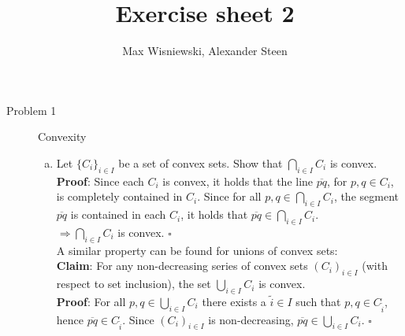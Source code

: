 \documentclass[11pt,a4paper,ngerman]{article}
\date{}
\title{Exercise sheet 2}
\author{Max Wisniewski, Alexander Steen}
\begin{document}

\renewcommand{\figurename}{Figure}

\maketitle
\thispagestyle{fancy}

\begin{description}
\item[Problem 1] Convexity
  \begin{enumerate}[a)]
    \item Let $\{C_i\}_{i \in I}$ be a set of convex sets. Show that $\bigcap_{i \in I} C_i$ is convex.\\

          \textbf{Proof}: Since each $C_i$ is convex, it holds that the line $\overline{pq}$,
                          for $p,q \in C_i$, is completely contained in $C_i$. 
                          Since for all $p,q \in \bigcap_{i \in I} C_i$, the segment 
                          $\overline{pq}$ is contained in each $C_i$, it holds that
                          $\overline{pq} \in \bigcap_{i \in I} C_i$.\\
                          $\Rightarrow \bigcap_{i \in I} C_i$ is convex.
                          \mbox{} \hfill $\square$ \\

          A similar property can be found for unions of convex sets: \\        
          \textbf{Claim}: For any non-decreasing series of
                          convex sets $(C_i)_{i \in I}$ (with respect to set inclusion),
                          the set $\bigcup_{i \in I} C_i$ is convex.\\
          \textbf{Proof}: For all $p,q \in \bigcup_{i \in I} C_i$ there exists a $\tilde{i} \in I$
                          such that $p,q \in C_{\tilde{i}}$, hence $\overline{pq} \in C_{\tilde{i}}$.
                          Since $(C_i)_{i \in I}$ is non-decreasing,
                          $\overline{pq} \in \bigcup_{i \in I} C_i$.
                          \mbox{} \hfill $\square$ 
                          

\end{enumerate}
\end{description}
\end{document}
